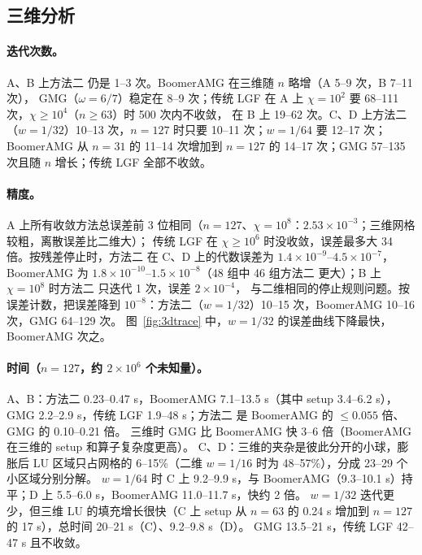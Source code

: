 \documentclass[11pt,a4paper]{ctexart}
\newcommand{\Mtwo}{方法二}
\begin{document}
\subsection{三维分析}
\paragraph{迭代次数。}A、B 上\Mtwo{} 仍是 1--3 次。BoomerAMG 在三维随 $n$ 略增（A 5--9 次，B 7--11 次），
GMG（$\omega=6/7$）稳定在 8--9 次；传统 LGF 在 A 上 $\chi=10^2$ 要 68--111 次，$\chi\ge10^4$（$n\ge63$）时 500 次内不收敛，
在 B 上 19--62 次。C、D 上\Mtwo{}（$w=1/32$）10--13 次，$n=127$ 时只要 10--11 次；$w=1/64$ 要 12--17 次；
BoomerAMG 从 $n=31$ 的 11--14 次增加到 $n=127$ 的 14--17 次；GMG 57--135 次且随 $n$ 增长；传统 LGF 全部不收敛。

\paragraph{精度。}A 上所有收敛方法总误差前 3 位相同（$n=127$、$\chi=10^8$：$2.53\times10^{-3}$；三维网格较粗，离散误差比二维大）；
传统 LGF 在 $\chi\ge10^6$ 时没收敛，误差最多大 34 倍。按残差停止时，\Mtwo{} 在 C、D 上的代数误差为 $1.4\times10^{-9}$--$4.5\times10^{-7}$，
BoomerAMG 为 $1.8\times10^{-10}$--$1.5\times10^{-8}$（48 组中 46 组\Mtwo{} 更大）；B 上 $\chi=10^8$ 时\Mtwo{} 只迭代 1 次，误差 $2\times10^{-4}$，
与二维相同的停止规则问题。按误差计数，把误差降到 $10^{-8}$：\Mtwo{}（$w=1/32$）10--15 次，BoomerAMG 10--16 次，GMG 64--129 次。
图~\ref{fig:3dtrace} 中，$w=1/32$ 的误差曲线下降最快，BoomerAMG 次之。

\paragraph{时间（$n=127$，约 $2\times10^6$ 个未知量）。}A、B：\Mtwo{} 0.23--0.47 s，BoomerAMG 7.1--13.5 s（其中 setup 3.4--6.2 s），
GMG 2.2--2.9 s，传统 LGF 1.9--48 s；\Mtwo{} 是 BoomerAMG 的 $\le0.055$ 倍、GMG 的 0.10--0.21 倍。
三维时 GMG 比 BoomerAMG 快 3--6 倍（BoomerAMG 在三维的 setup 和算子复杂度更高）。
C、D：三维的夹杂是彼此分开的小球，膨胀后 LU 区域只占网格的 6--15\%（二维 $w=1/16$ 时为 48--57\%），分成 23--29 个小区域分别分解。
$w=1/64$ 时 C 上 9.2--9.9 s，与 BoomerAMG（9.3--10.1 s）持平；D 上 5.5--6.0 s，BoomerAMG 11.0--11.7 s，快约 2 倍。
$w=1/32$ 迭代更少，但三维 LU 的填充增长很快（C 上 setup 从 $n=63$ 的 0.24 s 增加到 $n=127$ 的 17 s），总时间 20--21 s（C）、9.2--9.8 s（D）。
GMG 13.5--21 s，传统 LGF 42--47 s 且不收敛。
\end{document}
